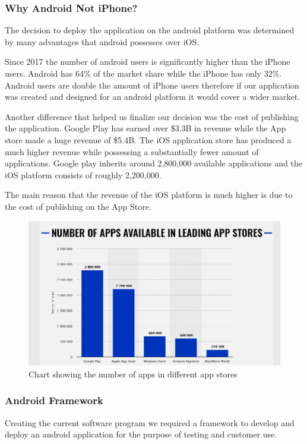 \documentclass[a4paper,12pt]{report}
\begin{document}
\subsubsection{Why Android Not iPhone?}
The decision to deploy the application on the android platform was determined by many advantages that android possesses over iOS.

Since 2017 the number of android users is significantly higher than the iPhone users. Android has 64\% of the market share while the iPhone has only 32\%.
Android users are double the amount of iPhone users therefore if our application was created and designed for an android platform it would cover a wider market.

Another difference that helped us finalize our decision was the cost of publishing the application. Google Play has earned over \$3.3B in revenue while the App store made a huge revenue of \$5.4B. The iOS application store has produced a much higher revenue while possessing a substantially fewer amount of applications. Google play inherits around 2,800,000 available applications and the iOS platform consists of roughly 2,200,000.  

The main reason that the revenue of the iOS platform is much higher is due to the cost of publishing on the App Store.\cite{android&iOS}

\begin{figure}[h]
    \begin{center}
    \includegraphics[scale=.4]{images/androidvsios.png}
    \caption{Chart showing the number of apps in different app stores}
    \label{fig:numberOfApp}
    \end{center}
\end{figure}
\subsubsection{Android Framework}
Creating the current software program we required a framework to develop and deploy an android application for the purpose of testing and customer use.
\end{document}

